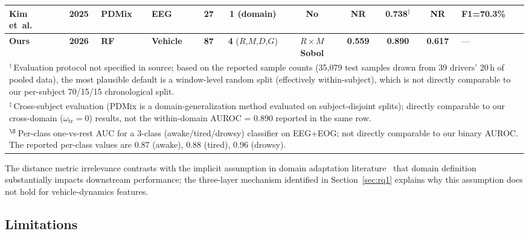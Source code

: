 \documentclass[lettersize,journal]{IEEEtran}
\begin{document}
\begin{table}[!t]
\begin{tabular}{|l|c|l|l|c|c|c|c|c|c|p{2.6cm}|}
\hline
Kim et~al.~\cite{kim2025}                  & 2025 & PDMix     & EEG     & 27 & 1 (domain)   & No               & NR & 0.738$^{\ddagger}$ & NR & {\scriptsize F1=70.3\%} \\
\hline
\textbf{Ours}                           & \textbf{2026} & \textbf{RF} & \textbf{Vehicle} & \textbf{87} & \textbf{4} ($R$,$M$,$D$,$G$) & $R{\times}M$ \textbf{Sobol} & \textbf{0.559} & \textbf{0.890} & \textbf{0.617} & --- \\
\hline
\multicolumn{11}{|p{0.97\textwidth}|}{\footnotesize $^{\dagger}$\,Evaluation protocol not specified in source; based on the reported sample counts (35{,}079 test samples drawn from 39 drivers' 20\,h of pooled data), the most plausible default is a window-level random split (effectively within-subject), which is not directly comparable to our per-subject 70/15/15 chronological split.} \\
\hline
\multicolumn{11}{|p{0.97\textwidth}|}{\footnotesize $^{\ddagger}$\,Cross-subject evaluation (PDMix is a domain-generalization method evaluated on subject-disjoint splits); directly comparable to our cross-domain ($\omega_{\mathrm{tr}}{=}0$) results, not the within-domain AUROC = 0.890 reported in the same row.} \\
\hline
\multicolumn{11}{|p{0.97\textwidth}|}{\footnotesize $^{\S}$\,Per-class one-vs-rest AUC for a 3-class (awake/tired/drowsy) classifier on EEG+EOG; not directly comparable to our binary AUROC. The reported per-class values are 0.87 (awake), 0.88 (tired), 0.96 (drowsy).} \\
\hline
\end{tabular}
\end{table}

The distance metric irrelevance contrasts with the implicit assumption in domain adaptation literature~\cite{pan2010,kim2025} that domain definition substantially impacts downstream performance; the three-layer mechanism identified in Section~\ref{sec:rq1} explains why this assumption does not hold for vehicle-dynamics features.

\subsection{Limitations}\label{sec:limitations}
\end{document}
